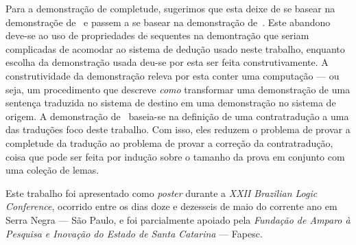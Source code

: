     \vspace{.3\baselineskip}
    Para a demonstração de completude, sugerimos que esta deixe de se basear na demonstraçõe de~\cite{Troelstra} e passem a se basear na demonstração de~\cite{Flagg}.
    Este abandono deve-se ao uso de propriedades de sequentes na demontração que seriam complicadas de acomodar ao sistema de dedução usado neste trabalho, enquanto escolha da demonstração usada deu-se por esta ser feita construtivamente.
    A construtividade da demonstração releva por esta conter uma computação --- ou seja, um procedimento que descreve \emph{como} transformar uma demonstração de uma sentença traduzida no sistema de destino em uma demonstração no sistema de origem.
    A demonstração de~\cite{Flagg} baseia-se na definição de uma contratradução a uma das traduções foco deste trabalho. Com isso, eles reduzem o problema de provar a completude da tradução ao problema de provar a correção da contratradução, coisa que pode ser feita por indução sobre o tamanho da prova em conjunto com uma coleção de lemas.

    \vspace{.3\baselineskip}
    Este trabalho foi apresentado como \emph{poster} durante a \emph{XXII Brazilian Logic Conference}, ocorrido entre os dias doze e dezesseis de maio do corrente ano em Serra Negra --- São Paulo, e foi parcialmente apoiado pela \emph{Fundação de Amparo à Pesquisa e Inovação do Estado de Santa Catarina} --- Fapesc.
